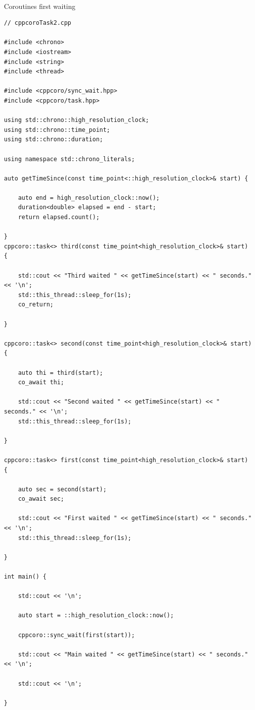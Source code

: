 \hspace*{\fill} \\ %
\noindent
Coroutines first waiting
\begin{lstlisting}[style=styleCXX]
// cppcoroTask2.cpp

#include <chrono>
#include <iostream>
#include <string>
#include <thread>

#include <cppcoro/sync_wait.hpp>
#include <cppcoro/task.hpp>

using std::chrono::high_resolution_clock;
using std::chrono::time_point;
using std::chrono::duration;

using namespace std::chrono_literals;

auto getTimeSince(const time_point<::high_resolution_clock>& start) {

	auto end = high_resolution_clock::now();
	duration<double> elapsed = end - start;
	return elapsed.count();

}
cppcoro::task<> third(const time_point<high_resolution_clock>& start) {

	std::cout << "Third waited " << getTimeSince(start) << " seconds." << '\n';
	std::this_thread::sleep_for(1s);
	co_return;

}

cppcoro::task<> second(const time_point<high_resolution_clock>& start) {

	auto thi = third(start);
	co_await thi;
	
	std::cout << "Second waited " << getTimeSince(start) << " seconds." << '\n';
	std::this_thread::sleep_for(1s);

}

cppcoro::task<> first(const time_point<high_resolution_clock>& start) {

	auto sec = second(start);
	co_await sec;
	
	std::cout << "First waited " << getTimeSince(start) << " seconds." << '\n';
	std::this_thread::sleep_for(1s);

}

int main() {

	std::cout << '\n';
	
	auto start = ::high_resolution_clock::now();
	
	cppcoro::sync_wait(first(start));
	
	std::cout << "Main waited " << getTimeSince(start) << " seconds." << '\n';
	
	std::cout << '\n';

}
\end{lstlisting}

